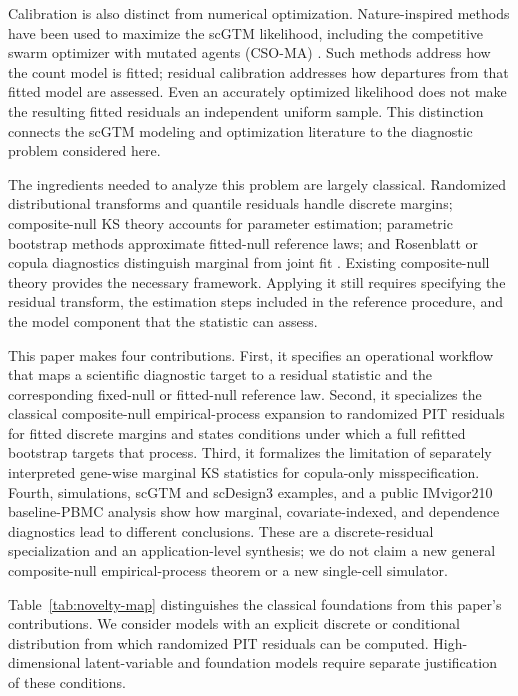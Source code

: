 \documentclass[preprint,12pt]{elsarticle}
\theoremstyle{plain}
\theoremstyle{remark}
\begin{document}
Calibration is also distinct from numerical optimization. Nature-inspired
methods have been used to maximize the scGTM likelihood, including the
competitive swarm optimizer with mutated agents (CSO-MA)
\citep{cui2024natureinspired}. Such methods address how the count model is
fitted; residual calibration addresses how departures from that fitted model
are assessed. Even an accurately optimized likelihood does not make the
resulting fitted residuals an independent uniform sample. This distinction
connects the scGTM modeling and optimization literature to the diagnostic
problem considered here.

The ingredients needed to analyze this problem are largely classical.
Randomized distributional transforms and quantile residuals handle discrete
margins; composite-null KS theory accounts for parameter estimation; parametric
bootstrap methods approximate fitted-null reference laws; and Rosenblatt or
copula diagnostics distinguish marginal from joint fit
\citep{rosenblatt1952remarks,dunn1996randomized,lilliefors1967kolmogorov,
durbin1973weak,khmaladze1981martingale,babu2004goodness}. Existing
composite-null theory provides the necessary framework. Applying it still
requires specifying the residual transform, the estimation steps included in
the reference procedure, and the model component that the statistic can assess.

This paper makes four contributions. First, it specifies an operational
workflow that maps a scientific diagnostic target to a residual statistic and
the corresponding fixed-null or fitted-null reference law. Second, it
specializes the classical composite-null empirical-process expansion to
randomized PIT residuals for fitted discrete margins and states conditions
under which a full refitted bootstrap targets that process. Third, it
formalizes the limitation of separately interpreted gene-wise marginal KS
statistics for copula-only misspecification. Fourth, simulations, scGTM and
scDesign3 examples, and a public IMvigor210 baseline-PBMC analysis
show how marginal, covariate-indexed, and dependence diagnostics lead to
different conclusions. These are a discrete-residual specialization and an
application-level synthesis; we do not claim a new general composite-null
empirical-process theorem or a new single-cell simulator.

Table~\ref{tab:novelty-map} distinguishes the classical foundations from this
paper's contributions. We consider models with an explicit discrete or
conditional distribution from which randomized PIT residuals can be computed.
High-dimensional latent-variable and foundation models require separate
justification of these conditions.
\end{document}
